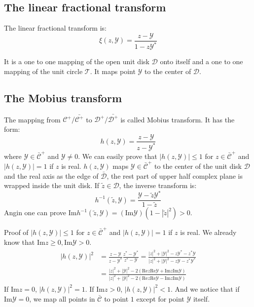 \documentclass[
	preprint,%
	aps,
	prb,
	showpacs,	
	amsmath, amssymb]{revtex4-2}
\DeclareRobustCommand{\+}{\hstretch{1.25} {\boldsymbol {\mathrel{+}}}}
\newcommand{\im}{ {\mathrm{Im}} }
\newcommand{\re}{ {\mathrm{Re}} }
\newcommand{\Y}{ {\mathcal{Y}} }
\newcommand{\C}{ {\mathcal{C}} }
\newcommand{\Cbar}{ {\bar{\mathcal{C}}} }
\newcommand{\D}{ {\mathcal{D}} }
\newcommand{\Dbar}{ {\bar{\mathcal{D}}} }
\begin{document}
\subsection{The linear fractional transform}
\label{appsub:linear-fractional-transform}
The linear fractional transform is:
\begin{equation}\label{eq:linear-fractional-transform}
	\xi(z, \Y) = \frac{z - \Y}{1 - z\Y^*}
\end{equation}

It is a one to one mapping of the open unit disk $\D$ onto 
itself and a one to one mapping of the unit circle $\mathcal{T}$.
It maps point $\Y$ to the center of $\D$.


\subsection{The Mobius transform}
\label{appsub:mobius-transform}
The mapping from $\C^+/\bar{\C^+}$ to 
$\D^+/\bar{\D^+}$ is called Mobius transform.
It has the form:
\begin{equation}\label{eq:def-mobius-transform}
	h(z, \Y)  = \frac{z - \Y}{z - \Y^*}
\end{equation}
where $\Y \in \Cbar^+$ and $\Y \neq 0$. We can easily prove that 
$|h(z, \Y)| \leq 1$ for $z \in \Cbar^+$ and
$|h(z, \Y)| = 1$ if $z$ is real. $h(z, \Y)$ maps $\Y \in \Cbar^+$
to the center of the unit disk $\D$ and the real axis as the 
edge of $\Dbar$, the rest part of upper half complex plane is 
wrapped inside the unit disk. If $ \tilde{z} \in \D$, the inverse 
transform is:
\begin{equation}\label{eq:def-inv-mobius-transform}
	h^{-1}(\tilde{z}, \Y) = \frac{\Y - \tilde{z}\Y^*}{1 - \tilde{z}}
\end{equation}
Angin one can prove 
$\im h^{-1}(\tilde{z}, \Y) = (\im\Y)(1 - |\tilde{z}|^2 ) > 0$.

Proof of $|h(z, \Y)| \leq 1$ for $z \in \Cbar^+$ and
$|h(z, \Y)| = 1$ if $z$ is real. 
We already know that $\im z \geq 0,  \im \Y >0$.
\begin{align}
\begin{split}
|h(z, \Y)|^2 &= \frac{z - \Y}{z - \Y^*} \frac{z^* - \Y^*}{z^* - \Y} 
	  = \frac{|z|^2 + |\Y|^2 - z\Y^* - z^*\Y}{|z|^2 + |\Y|^2 - z\Y - z^*\Y^*}\\
	& = \frac{|z|^2 + |\Y|^2 - 2(\re z \re \Y  + \im z \im \Y)}
		{|z|^2 + |\Y|^2 - 2(\re z \re \Y  - \im z \im \Y)}
\end{split}
\end{align}
If $\im z = 0$, $|h(z, \Y)|^2 = 1$. If $\im z > 0$, $|h(z, \Y)|^2 < 1$.
And we notice that if $\im \Y = 0$, we map all points in $\Cbar$ to 
point $1$ except for point $\Y$ itself.


\end{document}
